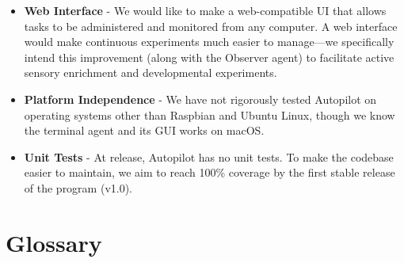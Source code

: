 \begin{fullwidth}
\begin{itemize}
    \item \textbf{Web Interface} - We would like to make a web-compatible UI that allows tasks to be administered and monitored from any computer. A web interface would make continuous experiments much easier to manage---we specifically intend this improvement (along with the Observer agent) to facilitate active sensory enrichment\citep{wellsSensoryStimulationEnvironmental2009,engineerEnvironmentalEnrichmentImproves2004a} and developmental experiments.
    \item \textbf{Platform Independence} - We have not rigorously tested Autopilot on operating systems other than Raspbian and Ubuntu Linux, though we know the terminal agent and its GUI works on macOS. 
    \item \textbf{Unit Tests} - At release, Autopilot has no unit tests. To make the codebase easier to maintain, we aim to reach 100\% coverage by the first stable release of the program (v1.0).
\end{itemize}
\end{fullwidth}


\chapter{Glossary}

